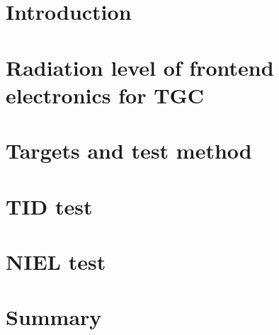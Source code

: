 \documentclass[final,5p,times]{elsarticle}
\begin{document}
\linenumbers

\section{Introduction}


\section{Radiation level of frontend electronics for TGC}


\section{Targets and test method}


\section{TID test}


\section{NIEL test}


\section{Summary}










\end{document}
